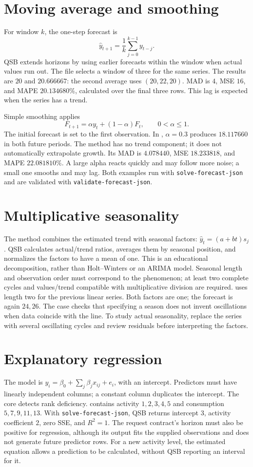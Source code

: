 \section{Moving average and smoothing}
For window \(k\), the one-step forecast is
\[
 \hat y_{t+1}=\frac1k\sum_{j=0}^{k-1}y_{t-j}.
\]
QSB extends horizons by using earlier forecasts within the window when actual
values run out. The file  selects a window of three
for the same series. The results are \(20\) and \(20.666667\): the second
average uses \((20,22,20)\). MAD is \(4\), MSE \(16\), and MAPE
\(20.134680\%\), calculated over the final three rows. This lag is expected
when the series has a trend.

Simple smoothing applies
\[
 F_{t+1}=\alpha y_t+(1-\alpha)F_t,\qquad 0<\alpha\le1.
\]
The initial forecast is set to the first observation. In
, \(\alpha=0.3\) produces \(18.117660\) in
both future periods. The method has no trend component; it does not
automatically extrapolate growth. Its MAD is \(4.078440\), MSE
\(18.233818\), and MAPE \(22.081810\%\). A large alpha reacts quickly
and may follow more noise; a small one smooths and may lag.
Both examples run with \texttt{solve-forecast-json} and are validated with
\texttt{validate-forecast-json}.

\section{Multiplicative seasonality}
The method combines the estimated trend with seasonal factors:
\(\hat y_t=(a+bt)s_j\). QSB calculates actual/trend ratios, averages them
by seasonal position, and normalizes the factors to have a mean of one.
This is an educational decomposition, rather than Holt--Winters or an ARIMA
model. Seasonal length and observation order must correspond to the phenomenon;
at least two complete cycles and values/trend compatible with multiplicative
division are required.
 uses length two for the previous linear series.
Both factors are one; the forecast is again \(24,26\). The case checks that
specifying a season does not invent oscillations when data coincide with the
line. To study actual seasonality, replace the series with several oscillating
cycles and review residuals before interpreting the factors.

\section{Explanatory regression}
The model is \(y_i=\beta_0+\sum_j\beta_jx_{ij}+e_i\), with an intercept.
Predictors must have linearly independent columns; a constant column duplicates
the intercept. The core detects rank deficiency.
 contains activity \(1,2,3,4,5\) and consumption
\(5,7,9,11,13\). With \texttt{solve-forecast-json}, QSB returns intercept
\(3\), activity coefficient \(2\), zero SSE, and \(R^2=1\).
The request contract's horizon must also be positive for regression, although
its output fits the supplied observations and does not generate future predictor
rows. For a new activity level, the estimated equation allows a prediction to
be calculated, without QSB reporting an interval for it.

